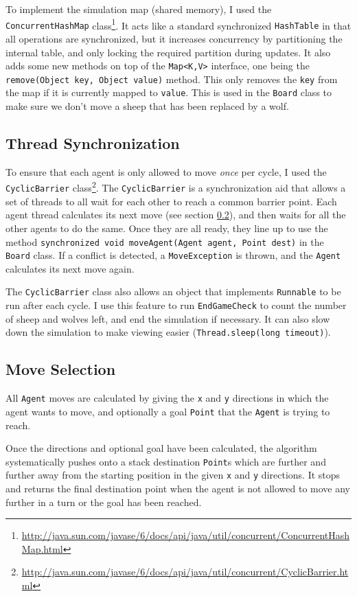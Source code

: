 \documentclass[pdftex,10pt]{article}
\begin{document}
To implement the simulation map (shared memory), I used the {\tt ConcurrentHashMap} class\footnote{\url{http://java.sun.com/javase/6/docs/api/java/util/concurrent/ConcurrentHashMap.html}}.  It acts like a standard synchronized {\tt HashTable} in that all operations are synchronized, but it increases concurrency by partitioning the internal table, and only locking the required partition during updates.  It also adds some new methods on top of the {\tt Map<K,V>} interface, one being the {\tt remove(Object key, Object value)} method.  This only removes the {\tt key} from the map if it is currently mapped to {\tt value}.  This is used in the {\tt Board} class to make sure we don't move a sheep that has been replaced by a wolf.

\subsection{Thread Synchronization}\label{threadSync}
To ensure that each agent is only allowed to move {\em once} per cycle, I used the {\tt CyclicBarrier} class\footnote{\url{http://java.sun.com/javase/6/docs/api/java/util/concurrent/CyclicBarrier.html}}.  The {\tt CyclicBarrier} is a synchronization aid that allows a set of threads to all wait for each other to reach a common barrier point.  Each agent thread calculates its next move (see section \ref{moveSel}), and then waits for all the other agents to do the same.  Once they are all ready, they line up to use the method {\tt synchronized void moveAgent(Agent agent, Point dest)} in the {\tt Board} class.  If a conflict is detected, a {\tt MoveException} is thrown, and the {\tt Agent} calculates its next move again.

The {\tt CyclicBarrier} class also allows an object that implements {\tt Runnable} to be run after each cycle.  I use this feature to run {\tt EndGameCheck} to count the number of sheep and wolves left, and end the simulation if necessary.  It can also slow down the simulation to make viewing easier ({\tt Thread.sleep(long timeout)}).

\subsection{Move Selection}\label{moveSel}
All {\tt Agent} moves are calculated by giving the {\tt x} and {\tt y} directions in which the agent wants to move, and optionally a goal {\tt Point} that the {\tt Agent} is trying to reach.

Once the directions and optional goal have been calculated, the algorithm systematically pushes onto a stack destination {\tt Point}s which are further and further away from the starting position in the given {\tt x} and {\tt y} directions.  It stops and returns the final destination point when the agent is not allowed to move any further in a turn or the goal has been reached.
\end{document}
